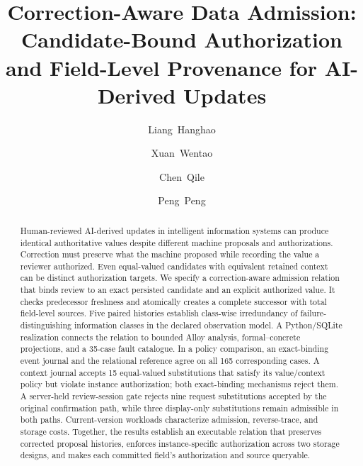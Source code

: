 \documentclass[smallcondensed,natbib,nospthms]{svjour3}
\begin{document}
\title{Correction-Aware Data Admission: Candidate-Bound Authorization and Field-Level Provenance for AI-Derived Updates}
\author{\mbox{Liang Hanghao} \and \mbox{Xuan Wentao} \and \mbox{Chen Qile} \and \mbox{Peng Peng}}
\date{}
\maketitle
\begin{abstract}
Human-reviewed AI-derived updates in intelligent information systems can produce identical authoritative values despite different machine proposals and authorizations. Correction must preserve what the machine proposed while recording the value a reviewer authorized. Even equal-valued candidates with equivalent retained context can be distinct authorization targets. We specify a correction-aware admission relation that binds review to an exact persisted candidate and an explicit authorized value. It checks predecessor freshness and atomically creates a complete successor with total field-level sources. Five paired histories establish class-wise irredundancy of failure-distinguishing information classes in the declared observation model. A Python/SQLite realization connects the relation to bounded Alloy analysis, formal--concrete projections, and a 35-case fault catalogue. In a policy comparison, an exact-binding event journal and the relational reference agree on all 165 corresponding cases. A context journal accepts 15 equal-valued substitutions that satisfy its value/context policy but violate instance authorization; both exact-binding mechanisms reject them. A server-held review-session gate rejects nine request substitutions accepted by the original confirmation path, while three display-only substitutions remain admissible in both paths. Current-version workloads characterize admission, reverse-trace, and storage costs. Together, the results establish an executable relation that preserves corrected proposal histories, enforces instance-specific authorization across two storage designs, and makes each committed field's authorization and source queryable.
\end{abstract}
















\end{document}
